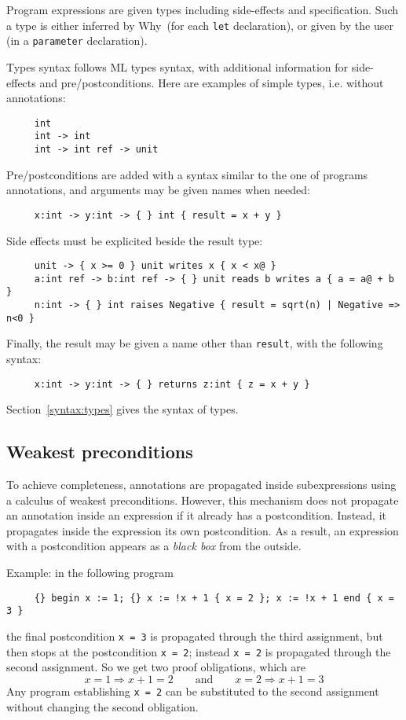\documentclass[a4paper,12pt]{report}
\makeatletter
\newcommand{\why}{\textsf{Why}}
\newcommand{\indextt}[1]{\index{#1@\texttt{#1}}}
\makeatother
\begin{document}
Program expressions are given types including side-effects and
specification. Such a type is either inferred by \why\ (for each
\texttt{let} declaration), or given by the user (in a
\texttt{parameter} declaration).

Types syntax follows ML types syntax, with additional information for
side-effects and pre/postconditions. Here are examples of simple types,
i.e. without annotations:
\begin{verbatim}
     int
     int -> int
     int -> int ref -> unit
\end{verbatim}
Pre/postconditions are added with a syntax similar to the one of
programs annotations, and arguments may be given names when needed:
\begin{verbatim}
     x:int -> y:int -> { } int { result = x + y }
\end{verbatim}
Side effects must be explicited beside the result type:
\indextt{reads}\indextt{writes}\indextt{raises}%
\begin{verbatim}
     unit -> { x >= 0 } unit writes x { x < x@ }
     a:int ref -> b:int ref -> { } unit reads b writes a { a = a@ + b }
     n:int -> { } int raises Negative { result = sqrt(n) | Negative => n<0 }
\end{verbatim}
Finally, the result may be given a name other than \texttt{result},
with the following syntax:
\begin{verbatim}
     x:int -> y:int -> { } returns z:int { z = x + y }
\end{verbatim}
Section~\ref{syntax:types} gives the syntax of types.


\subsection{Weakest preconditions}
\label{wp}
To achieve completeness, annotations are propagated inside
subexpressions using a calculus of weakest preconditions.
However, this mechanism does not propagate an annotation inside an
expression if it already has a postcondition. Instead, it propagates
inside the expression its own postcondition. As a result, an
expression with a postcondition appears as a \emph{black box} from the
outside. 

Example: in the following program
\begin{verbatim}
     {} begin x := 1; {} x := !x + 1 { x = 2 }; x := !x + 1 end { x = 3 }
\end{verbatim}
the final postcondition \texttt{x = 3} is propagated through the third
assignment, but then stops at the postcondition \texttt{x = 2};
instead \texttt{x = 2} is propagated through the second
assignment. So we get two proof obligations, which are
\begin{displaymath}
  x=1 \Rightarrow x+1=2 
  \qquad\mbox{and}\qquad
  x=2 \Rightarrow x+1=3
\end{displaymath}
Any program establishing \texttt{x = 2} can be substituted to the
second assignment without changing the second obligation.
\end{document}
